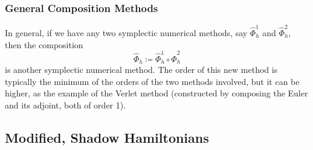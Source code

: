 \documentclass{article}
\begin{document}
    \subsubsection{General Composition Methods}

      In general, if we have any two symplectic numerical methods, say $\hat{\Phi}_h^1$ and $\hat{\Phi}_h^2$, then the composition 
      \begin{equation}
        \hat{\Phi}_h \coloneqq \hat{\Phi}_h^1 \circ \hat{\Phi}_h^2
      \end{equation}
      is another symplectic numerical method. The order of this new method is typically the minimum of the orders of the two methods involved, but it can be higher, as the example of the Verlet method (constructed by composing the Euler and its adjoint, both of order 1). 

  \subsection{Modified, Shadow Hamiltonians}
\end{document}
